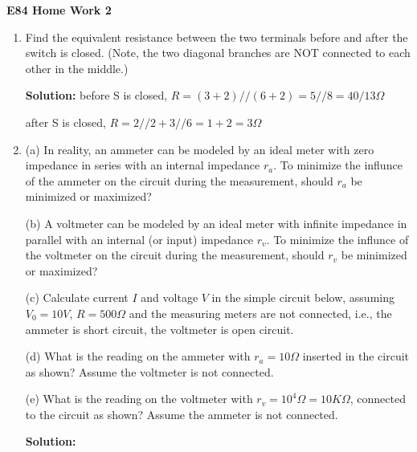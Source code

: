 \usepackage{html}

\begin{center}
{\Large \bf E84 Home Work 2}
\end{center}
\begin{enumerate}

The calculations of all problems in this problem set are straight forward.
However, the concepts involving source, load, internal (output) impedance
of the source and the input impedance of the load are very important. After
finding the numerical solutions of the problem, pause and reflect what they
mean. 

\item Find the equivalent resistance between the two terminals before and
after the switch is closed. (Note, the two diagonal branches are NOT
connected to each other in the middle.)


{\bf Solution:}
 before S is closed, $R=(3+2)//(6+2)=5//8=40/13 \Omega$

 after S is closed, $R=2//2+3//6=1+2=3 \Omega$

\item (a) In reality, an ammeter can be modeled by an ideal meter with zero impedance 
  in series with an internal impedance $r_a$. To minimize the influnce of the ammeter
  on the circuit during the measurement, should $r_a$ be minimized or maximized?

  (b) A voltmeter can be modeled by an ideal meter with infinite impedance in parallel
  with an internal (or input) impedance $r_v$. To minimize the influnce of the voltmeter 
  on the circuit during the measurement, should $r_v$ be minimized or maximized?

  (c) Calculate current $I$ and voltage $V$ in the simple circuit below, assuming 
  $V_0=10V$, $R=500\Omega$ and the measuring meters are not connected, i.e., the ammeter
  is short circuit, the voltmeter is open circuit.

  (d) What is the reading on the ammeter with $r_a=10\Omega$ inserted in the circuit 
  as shown? Assume the voltmeter is not connected.

  (e) What is the reading on the voltmeter with $r_v=10^4 \Omega = 10 K\Omega$, connected
  to the circuit as shown? Assume the ammeter is not connected.


  {\bf Solution:} 


\end{enumerate}

